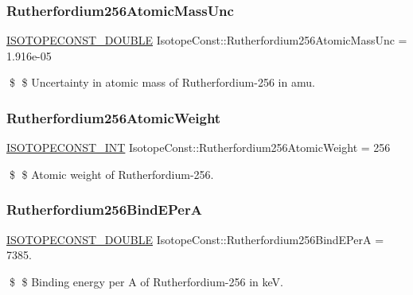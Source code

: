 \subsubsection{\texorpdfstring{Rutherfordium256\+Atomic\+Mass\+Unc}{Rutherfordium256AtomicMassUnc}}
{\footnotesize\ttfamily \mbox{\hyperlink{group___isotope_const-_macros_ga8f45a7272ce02c0b4c65c44636ed719a}{I\+S\+O\+T\+O\+P\+E\+C\+O\+N\+S\+T\+\_\+\+D\+O\+U\+B\+LE}} Isotope\+Const\+::\+Rutherfordium256\+Atomic\+Mass\+Unc = 1.\+916e-\/05}

\$ \$ Uncertainty in atomic mass of Rutherfordium-\/256 in amu. \mbox{\label{group___isotope_const-_rutherfordium-_rf256_ga24e4177455f374fe2e2314cb0dcb0f0d}} 
\subsubsection{\texorpdfstring{Rutherfordium256\+Atomic\+Weight}{Rutherfordium256AtomicWeight}}
{\footnotesize\ttfamily \mbox{\hyperlink{group___isotope_const-_macros_ga5f18360b3e99483a35c32d789e62621c}{I\+S\+O\+T\+O\+P\+E\+C\+O\+N\+S\+T\+\_\+\+I\+NT}} Isotope\+Const\+::\+Rutherfordium256\+Atomic\+Weight = 256}

\$ \$ Atomic weight of Rutherfordium-\/256. \mbox{\label{group___isotope_const-_rutherfordium-_rf256_gad28b6297343f379046c66a47e35f7823}} 
\subsubsection{\texorpdfstring{Rutherfordium256\+Bind\+E\+PerA}{Rutherfordium256BindEPerA}}
{\footnotesize\ttfamily \mbox{\hyperlink{group___isotope_const-_macros_ga8f45a7272ce02c0b4c65c44636ed719a}{I\+S\+O\+T\+O\+P\+E\+C\+O\+N\+S\+T\+\_\+\+D\+O\+U\+B\+LE}} Isotope\+Const\+::\+Rutherfordium256\+Bind\+E\+PerA = 7385.}

\$ \$ Binding energy per A of Rutherfordium-\/256 in keV. \mbox{\label{group___isotope_const-_rutherfordium-_rf256_ga60582dbf0ae1aeb54f9e456cfc24fd0e}} 
